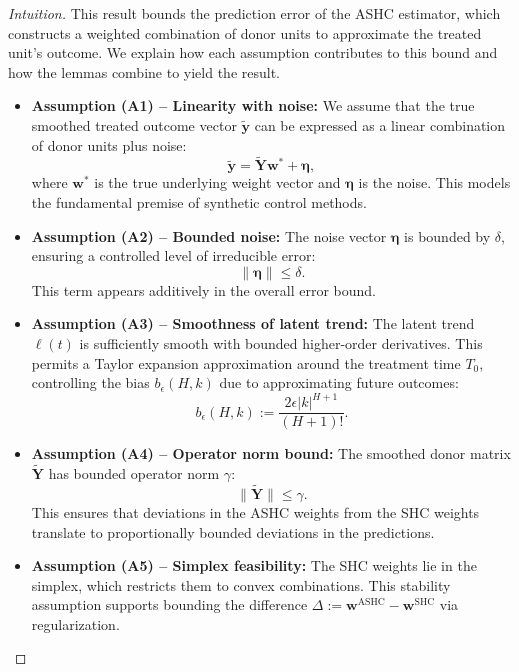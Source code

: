 \documentclass{article}
\begin{document}
\begin{proof}[Intuition]

This result bounds the prediction error of the ASHC estimator, which constructs a weighted combination of donor units to approximate the treated unit's outcome. We explain how each assumption contributes to this bound and how the lemmas combine to yield the result.

\begin{itemize}

\item \textbf{Assumption (A1) -- Linearity with noise:} 
We assume that the true smoothed treated outcome vector \(\widetilde{\mathbf{y}}\) can be expressed as a linear combination of donor units plus noise:
\[
\widetilde{\mathbf{y}} = \widetilde{\mathbf{Y}} \mathbf{w}^* + \bm{\eta},
\]
where \(\mathbf{w}^*\) is the true underlying weight vector and \(\bm{\eta}\) is the noise. This models the fundamental premise of synthetic control methods.

\item \textbf{Assumption (A2) -- Bounded noise:} 
The noise vector \(\bm{\eta}\) is bounded by \(\delta\), ensuring a controlled level of irreducible error:
\[
\|\bm{\eta}\| \leq \delta.
\]
This term appears additively in the overall error bound.

\item \textbf{Assumption (A3) -- Smoothness of latent trend:} 
The latent trend \(\ell(t)\) is sufficiently smooth with bounded higher-order derivatives. This permits a Taylor expansion approximation around the treatment time \(T_0\), controlling the bias \(b_\epsilon(H,k)\) due to approximating future outcomes:
\[
b_\epsilon(H,k) := \frac{2 \epsilon |k|^{H+1}}{(H+1)!}.
\]

\item \textbf{Assumption (A4) -- Operator norm bound:} 
The smoothed donor matrix \(\widetilde{\mathbf{Y}}\) has bounded operator norm \(\gamma\):
\[
\|\widetilde{\mathbf{Y}}\| \leq \gamma.
\]
This ensures that deviations in the ASHC weights from the SHC weights translate to proportionally bounded deviations in the predictions.

\item \textbf{Assumption (A5) -- Simplex feasibility:} 
The SHC weights lie in the simplex, which restricts them to convex combinations. This stability assumption supports bounding the difference \(\Delta := \mathbf{w}^{\text{ASHC}} - \mathbf{w}^{\text{SHC}}\) via regularization.

\end{itemize}


\end{proof}
\end{document}
